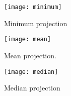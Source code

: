 \documentclass{InsightArticle}
\begin{document}
\begin{figure}[htbp]
\centering
\texttt{[image: minimum]}
\caption{Minimum projection}
\end{figure}

\begin{figure}[htbp]
\centering
\texttt{[image: mean]}
\caption{Mean projection.}
\end{figure}

\begin{figure}[htbp]
\centering
\texttt{[image: median]}
\caption{Median projection}
\end{figure}



\appendix





\nocite{ITKSoftwareGuide}
\end{document}
